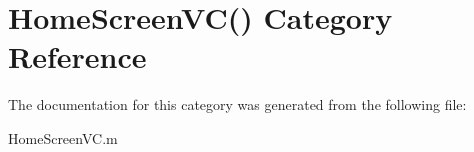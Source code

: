 \hypertarget{category_home_screen_v_c_07_08}{\section{Home\-Screen\-V\-C() Category Reference}
\label{category_home_screen_v_c_07_08}
}


The documentation for this category was generated from the following file\-:\begin{DoxyCompactItemize}
\item 
Home\-Screen\-V\-C.\-m\end{DoxyCompactItemize}
